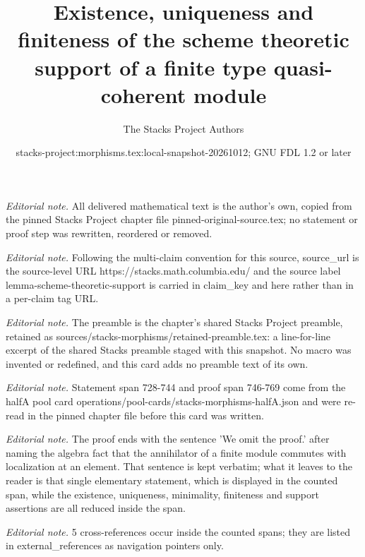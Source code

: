 \documentclass[10pt,a4paper]{amsart}
\title{Existence, uniqueness and finiteness of the scheme theoretic support of a finite type quasi-coherent module}
\author{The Stacks Project Authors}
\date{stacks-project:morphisms.tex:local-snapshot-20261012; GNU FDL 1.2 or later}
\theoremstyle{plain}
\theoremstyle{definition}
\theoremstyle{remark}
\numberwithin{equation}{subsection}
\begin{document}
\maketitle
\noindent\textit{Editorial note.} All delivered mathematical text is the author's own, copied from the pinned Stacks Project chapter file pinned-original-source.tex; no statement or proof step was rewritten, reordered or removed.\par\medskip
\noindent\textit{Editorial note.} Following the multi-claim convention for this source, source\_url is the source-level URL https://stacks.math.columbia.edu/ and the source label lemma-scheme-theoretic-support is carried in claim\_key and here rather than in a per-claim tag URL.\par\medskip
\noindent\textit{Editorial note.} The preamble is the chapter's shared Stacks Project preamble, retained as sources/stacks-morphisms/retained-preamble.tex: a line-for-line excerpt of the shared Stacks preamble staged with this snapshot. No macro was invented or redefined, and this card adds no preamble text of its own.\par\medskip
\noindent\textit{Editorial note.} Statement span 728-744 and proof span 746-769 come from the halfA pool card operations/pool-cards/stacks-morphisms-halfA.json and were re-read in the pinned chapter file before this card was written.\par\medskip
\noindent\textit{Editorial note.} The proof ends with the sentence 'We omit the proof.' after naming the algebra fact that the annihilator of a finite module commutes with localization at an element. That sentence is kept verbatim; what it leaves to the reader is that single elementary statement, which is displayed in the counted span, while the existence, uniqueness, minimality, finiteness and support assertions are all reduced inside the span.\par\medskip
\noindent\textit{Editorial note.} 5 cross-references occur inside the counted spans; they are listed in external\_references as navigation pointers only.\par\medskip
\end{document}
